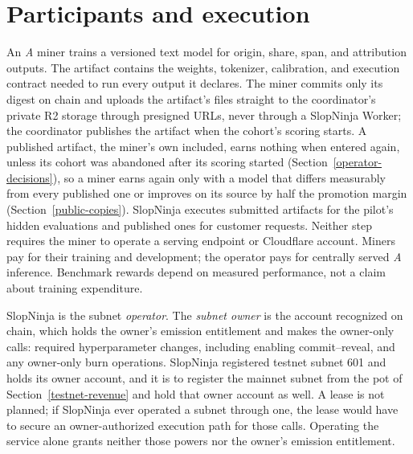 \section{Participants and execution}\label{participants-and-the-two-kinds-of-work}

An \textit{A} miner trains a versioned text model for origin, share, span, and
attribution outputs. The artifact contains the weights, tokenizer, calibration,
and execution contract needed to run every output it declares. The miner commits only its
digest on chain and uploads the artifact's files straight to the coordinator's
private R2 storage through presigned URLs, never through a SlopNinja Worker;
the coordinator publishes the artifact when the cohort's scoring starts. A published artifact, the miner's own
included, earns nothing when entered again, unless its cohort was abandoned
after its scoring started (Section~\ref{operator-decisions}), so a miner earns again only with a
model that differs measurably from every published one or improves on its
source by half the promotion margin (Section~\ref{public-copies}).
SlopNinja executes
submitted artifacts for the pilot's hidden evaluations and published ones for
customer requests. Neither step requires the miner to operate a serving
endpoint or Cloudflare account.
Miners pay for their training and development; the operator pays for centrally
served \textit{A} inference. Benchmark rewards depend on measured performance,
not a claim about training expenditure.

SlopNinja is the subnet \emph{operator}. The \emph{subnet owner} is the account
recognized on chain, which holds the owner's emission entitlement and makes
the owner-only calls: required hyperparameter changes, including enabling
commit--reveal, and any owner-only burn operations. SlopNinja registered
testnet subnet 601 and holds its owner account, and it is to register the
mainnet subnet from the pot of Section~\ref{testnet-revenue} and hold that
owner account as well. A lease is not planned; if SlopNinja ever operated a
subnet through one, the lease would have to secure an owner-authorized
execution path for those calls. Operating the service alone grants neither
those powers nor the owner's emission entitlement.

